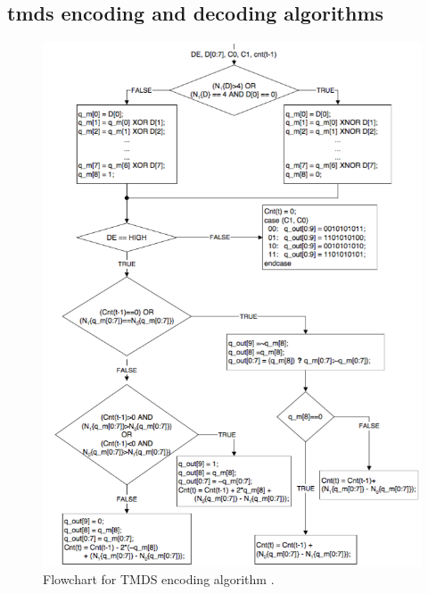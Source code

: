 \begin{appendices}
\chapter{\Gls{tmds} encoding and decoding algorithms}
\begin{figure}
  \centering
  \includegraphics[width=1\textwidth]{./img/tmds_encode.png}
  \caption{Flowchart for TMDS encoding algorithm \cite{dvi_spec}.}
  \label{fig:tmds_encoding_algorithm}
\end{figure}


\end{appendices}
